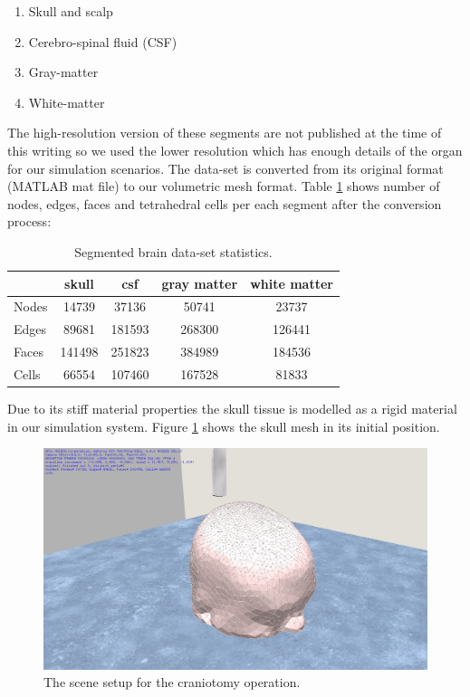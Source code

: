 \begin{enumerate}
 \item Skull and scalp
 \item Cerebro-spinal fluid (CSF)
 \item Gray-matter
 \item White-matter
\end{enumerate}

The high-resolution version of these segments are not published at the time of this writing so we used the lower resolution 
which has enough details of the organ for our simulation scenarios. The data-set is converted from its original format 
(MATLAB mat file) to our volumetric mesh format. Table \ref{table:brainmesh} shows number of nodes, edges, faces and tetrahedral cells 
per each segment after the conversion process:

\begin{table}[H]
\begin{center}
\caption{\label{table:brainmesh}{Segmented brain data-set statistics.}}
  \begin{tabular}{ | l | c | c | c | c |}
    \hline    
     & skull & csf & gray matter & white matter \\ \hline \hline    
    Nodes & 14739 & 37136 & 50741 & 23737  \\ \hline
    Edges & 89681 & 181593 & 268300 & 126441 \\ \hline
    Faces & 141498 & 251823 & 384989 & 184536 \\ \hline
    Cells & 66554 & 107460 & 167528 & 81833 \\ \hline
    \hline
  \end{tabular}
\end{center}
\end{table}

Due to its stiff material properties the skull tissue is modelled as a rigid material in our simulation system. 
Figure \ref{fig:craniotomy01} shows the skull mesh in its initial position.

\begin{figure}[H]
  \centering
  \includegraphics[width=0.7\linewidth]{figures/evaluation/craniotomy01.png}
  \caption{\label{fig:craniotomy01}
  {The scene setup for the craniotomy operation.}
}
\end{figure}


